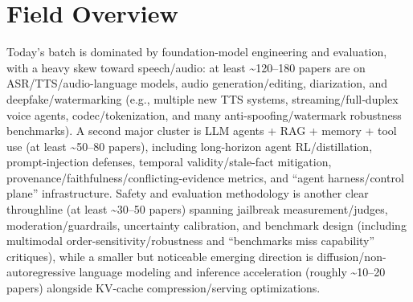 \documentclass[12pt,letterpaper]{article}
\begin{document}
\section*{Field Overview}
{\footnotesize Today's batch is dominated by foundation-model engineering and evaluation, with a heavy skew toward speech/audio: at least \textasciitilde{}120--180 papers are on ASR/TTS/audio-language models, audio generation/editing, diarization, and deepfake/watermarking (e.g., multiple new TTS systems, streaming/full‑duplex voice agents, codec/tokenization, and many anti-spoofing/watermark robustness benchmarks). A second major cluster is LLM agents + RAG + memory + tool use (at least \textasciitilde{}50--80 papers), including long-horizon agent RL/distillation, prompt-injection defenses, temporal validity/stale-fact mitigation, provenance/faithfulness/conflicting-evidence metrics, and ``agent harness/control plane'' infrastructure. Safety and evaluation methodology is another clear throughline (at least \textasciitilde{}30--50 papers) spanning jailbreak measurement/judges, moderation/guardrails, uncertainty calibration, and benchmark design (including multimodal order-sensitivity/robustness and ``benchmarks miss capability'' critiques), while a smaller but noticeable emerging direction is diffusion/non-autoregressive language modeling and inference acceleration (roughly \textasciitilde{}10--20 papers) alongside KV-cache compression/serving optimizations.}
\end{document}
